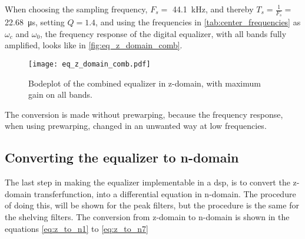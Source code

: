 When choosing the sampling frequency, $F_s =$ \SI{44.1}{\kilo \hertz}, and thereby $T_s = \frac{1}{F_s} =$ \SI{22.68}{\micro \second}, setting $Q = 1.4$, and using the frequencies in \autoref{tab:center_frequencies} as $\omega_c$ and $\omega_0$, the frequency response of the digital equalizer, with all bands fully amplified, looks like in \autoref{fig:eq_z_domain_comb}.

\begin{figure}[!h]
    \centering
        \texttt{[image: eq\_z\_domain\_comb.pdf]}
        \caption{Bodeplot of the combined equalizer in z-domain, with maximum gain on all bands.}
        \label{fig:eq_z_domain_comb}
  \end{figure}

The conversion is made without prewarping, because the frequency response, when using prewarping, changed in an unwanted way at low frequencies.

\subsection{Converting the equalizer to n-domain}
The last step in making the equalizer implementable in a \gls{dsp}, is to convert the z-domain transferfunction, into a differential equation in n-domain. The procedure of doing this, will be shown for the peak filters, but the procedure is the same for the shelving filters. The conversion from z-domain to n-domain is shown in the equations \autoref{eq:z_to_n1} to \autoref{eq:z_to_n7} 

